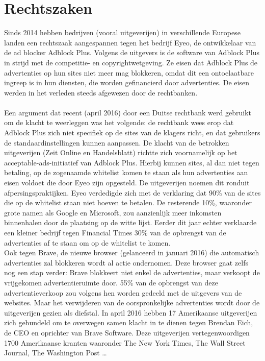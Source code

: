 \documentclass[pdftex,a4paper,12pt,twoside]{report}
\begin{document}
\section{Rechtszaken}
\label{sec Rechtszaken}
Sinds 2014 hebben bedrijven (vooral uitgeverijen) in verschillende Europese landen een rechtszaak aangespannen tegen het bedrijf Eyeo, de ontwikkelaar van de ad blocker Adblock Plus. Volgens de uitgevers is de software van Adblock Plus in strijd met de competitie- en copyrightwetgeving. Ze eisen dat Adblock Plus de advertenties op hun sites niet meer mag blokkeren, omdat dit een ontoelaatbare ingreep is in hun diensten, die worden gefinancierd door advertenties. 
De eisen werden in het verleden steeds afgewezen door de rechtbanken. 
\\
\\
Een argument dat recent (april 2016) door een Duitse rechtbank werd gebruikt om de klacht te weerleggen was het volgende: de rechtbank wees erop dat Adblock Plus zich niet specifiek op de sites van de klagers richt, en dat gebruikers de standaardinstellingen kunnen aanpassen. De klacht van de betrokken uitgeverijen (Zeit Online en Handelsblatt) richtte zich voornamelijk op het acceptable-ads-initiatief van Adblock Plus. Hierbij kunnen sites, al dan niet tegen betaling, op de zogenaamde whitelist komen te staan als hun advertenties aan eisen voldoet die door Eyeo zijn opgesteld. De uitgeverijen noemen dit ronduit afpersingspraktijken.
Eyeo verdedigde zich met de verklaring dat 90\% van de sites die op de whitelist staan niet hoeven te betalen. De resterende 10\%, waaronder grote namen als Google en Microsoft, zou aanzienlijk meer inkomsten binnenhalen door de plaatsing op de witte lijst. 
Eerder dit jaar echter verklaarde een kleiner bedrijf tegen Financial Times 30\% van de opbrengst van de advertenties af te staan om op de whitelist te komen.
\\
Ook tegen Brave, de nieuwe browser (gelanceerd in januari 2016) die automatisch advertenties zal blokkeren wordt al actie ondernomen. Deze browser gaat zelfs nog een stap verder: Brave blokkeert niet enkel de advertenties, maar verkoopt de vrijgekomen advertentieruimte door. 55\% van de opbrengst van deze advertentieverkoop zou volgens hen worden gedeeld met de uitgevers van de websites. Maar het verwijderen van de oorspronkelijke advertenties wordt door de uitgeverijen gezien als diefstal.
In april 2016 hebben 17 Amerikaanse uitgeverijen zich gebundeld om te overwegen samen klacht in te dienen tegen Brendan Eich, de CEO en oprichter van Brave Software. Deze uitgeverijen vertegenwoordigen 1700 Amerikaanse kranten waaronder The New York Times, The Wall Street Journal, The Washington Post …
\end{document}

